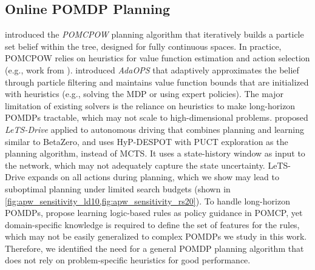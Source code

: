 \subsection{Online POMDP Planning}
\textcite{sunberg2018online} introduced the \textit{POMCPOW} planning algorithm that iteratively builds a particle set belief within the tree, designed for fully continuous spaces.
In practice, POMCPOW relies on heuristics for value function estimation and action selection (e.g., work from \textcite{mern2023intelligent}).
\textcite{wu2021adaptive} introduced \textit{AdaOPS} that adaptively approximates the belief through particle filtering and maintains value function bounds that are initialized with heuristics (e.g., solving the MDP or using expert policies).
The major limitation of existing solvers is the reliance on heuristics to make long-horizon POMDPs tractable, which may not scale to high-dimensional problems.
\textcite{cai2022closing} proposed \textit{LeTS-Drive} applied to autonomous driving that combines planning and learning similar to BetaZero, and uses HyP-DESPOT with PUCT exploration \cite{cai2021hyp} as the planning algorithm, instead of MCTS.
It uses a state-history window as input to the network, which may not adequately capture the state uncertainty.
LeTS-Drive expands on all actions during planning, which we show may lead to suboptimal planning under limited search budgets (shown in \cref{fig:apw_sensitivity_ld10,fig:apw_sensitivity_rs20}).
To handle long-horizon POMDPs, \textcite{mazzi2023learning} propose learning logic-based rules as policy guidance in POMCP, yet domain-specific knowledge is required to define the set of features for the rules, which may not be easily generalized to complex POMDPs we study in this work.
Therefore, we identified the need for a general POMDP planning algorithm that does not rely on problem-specific heuristics for good performance.


